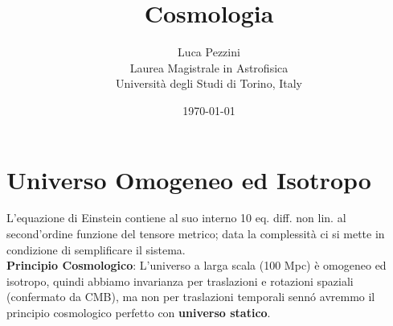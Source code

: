 \documentclass[12pt, a4paper]{article}
\begin{document}
\title{Cosmologia}
\author{Luca Pezzini \\ Laurea Magistrale in Astrofisica \\ Universit\`{a} degli Studi di Torino, Italy}
\date{\today}

\maketitle
\newpage
\tableofcontents
\newpage
\section{Universo Omogeneo ed Isotropo}
L'equazione di Einstein contiene al suo interno 10 eq. diff. non lin. al second'ordine funzione del tensore metrico; data la complessità ci si mette in condizione di semplificare il sistema.\\ 
\textbf{Principio Cosmologico}: L'universo a larga scala (100 Mpc) è omogeneo ed isotropo, quindi abbiamo invarianza per traslazioni e  rotazioni spaziali (confermato da CMB), ma non per traslazioni temporali senn\'{o} avremmo il principio cosmologico perfetto con \textbf{universo  statico}.
\end{document}

